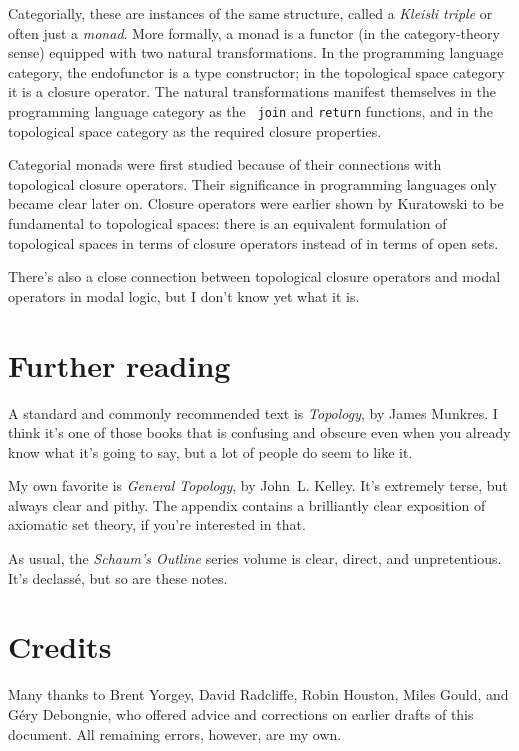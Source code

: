 \documentclass{article}
\begin{document}
Categorially, these are instances of the same structure, called a {\em
  Kleisli triple\/} or often just a {\em monad\/}.  More formally, a
monad is a functor (in the category-theory sense) equipped with
two natural transformations.  In the programming language category,
the endofunctor is a type constructor; in the topological space
category it is a closure operator.  The natural transformations
manifest themselves in the programming language category as the {\tt
  join} and {\tt return} functions, and in the topological space
category as the required closure properties.

Categorial monads were first studied because of their connections with
topological closure operators.  Their significance in programming
languages only became clear later on.  Closure operators were earlier
shown by Kuratowski to be fundamental to topological spaces: there is
an equivalent formulation of topological spaces in terms of closure
operators instead of in terms of open sets.

There's also a close connection between topological closure operators
and modal operators in modal logic, but I don't know yet what it is.

\section*{Further reading}

A standard and commonly recommended text is {\em Topology\/}, by James
Munkres.  I think it's one of those books that is confusing and
obscure even when you already know what it's going to say, but a lot
of people do seem to like it.

My own favorite is {\em General Topology\/}, by John~L. Kelley.  It's
extremely terse, but always clear and pithy.  The appendix contains a
brilliantly clear exposition of axiomatic set theory, if you're
interested in that.

As usual, the {\em Schaum's Outline\/} series volume is clear, direct,
and unpretentious.  It's declass\'e, but so are these notes.

\section*{Credits}

Many thanks to Brent Yorgey, David Radcliffe, Robin Houston, Miles
Gould, and G\'ery Debongnie, who offered advice and corrections on
earlier drafts of this document.  All remaining errors, however, are
my own.
\end{document}

